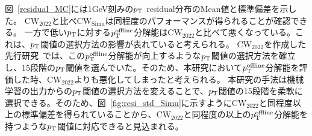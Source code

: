 図~\ref{residual_MC}には1GeV刻みの$p_{\rm{T}}$ residual分布のMean値と標準偏差を示した。
$\mathrm{CW_{2022}}$と比べ$\mathrm{CW_{Simu}}$は同程度のパフォーマンスが得られることが確認できる。
一方で低い$p_{\rm{T}}$に対する$p_{\rm{T}}^{\rm{offline}}$分解能は$\mathrm{CW_{2022}}$と比べて悪くなっている。これは、$p_{\rm{T}}$閾値の選択方法の影響が表れていると考えられる。
$\mathrm{CW_{2022}}$を作成した先行研究~\cite{article:shiomi-mron}では、この$p_{\rm{T}}^{\rm{offline}}$分解能が向上するような$p_{\rm{T}}$閾値の選択方法を確立し、15段階の$p_{\rm{T}}$閾値を選んでいた。そのため、本研究において$p_{\rm{T}}^{\rm{offline}}$分解能を評価した時、$\mathrm{CW_{2022}}$よりも悪化してしまったと考えられる。
本研究の手法は機械学習の出力からの$p_{\rm{T}}$閾値の選択方法を変えることで、$p_{\rm{T}}$閾値の15段階を柔軟に選択できる。そのため、図~\ref{fig:resi_std_Simu}に示すように$\mathrm{CW_{2022}}$と同程度以上の標準偏差を得られていることから、$\mathrm{CW_{2022}}$と同程度の以上の$p_{\rm{T}}^{\rm{offline}}$分解能を持つような$p_{\rm{T}}$閾値に対応できると見込まれる。

